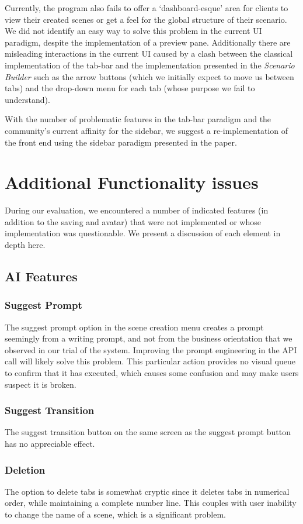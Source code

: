 \documentclass[sigconf]{acmart}
\begin{document}
Currently, the program also fails to offer a `dashboard-esque' area for clients to view their created scenes or get a feel for the global structure of their scenario. We did not identify an easy way to solve this problem in the current UI paradigm, despite the implementation of a preview pane. Additionally there are misleading interactions in the current UI caused by a clash between the classical implementation of the tab-bar and the implementation presented in the \textit{Scenario Builder} such as the arrow buttons (which we initially expect to move us between tabs) and the drop-down menu for each tab (whose purpose we fail to understand).

With the number of problematic features in the tab-bar paradigm and the community's current affinity for the sidebar, we suggest a re-implementation of the front end using the sidebar paradigm presented in the paper.


\section{Additional Functionality issues}
During our evaluation, we encountered a number of indicated features (in addition to the saving and avatar) that were not implemented or whose implementation was questionable. We present a discussion of each element in depth here.

\subsection{AI Features}
\subsubsection{Suggest Prompt}
The suggest prompt option in the scene creation menu creates a prompt seemingly from a writing prompt, and not from the business orientation that we observed in our trial of the system. Improving the prompt engineering in the API call will likely solve this problem. This particular action provides no visual queue to confirm that it has executed, which causes some confusion and may make users suspect it is broken.

\subsubsection{Suggest Transition}
The suggest transition button on the same screen as the suggest prompt button has no appreciable effect.

\subsubsection{Deletion}
The option to delete tabs is somewhat cryptic since it deletes tabs in numerical order, while maintaining a complete number line. This couples with user inability to change the name of a scene, which is a significant problem.
\end{document}
